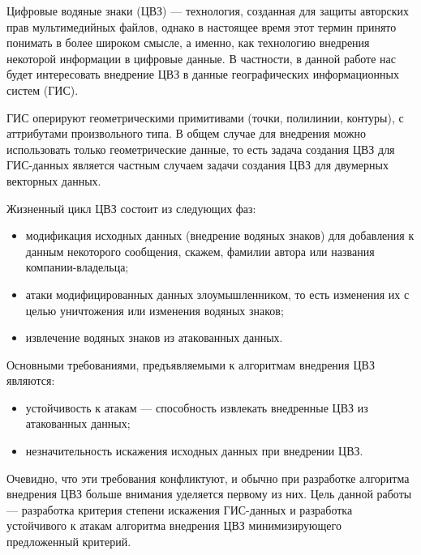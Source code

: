\startprefacepage

Цифровые водяные знаки (ЦВЗ) --- технология, созданная для защиты авторских прав мультимедийных файлов,
однако в настоящее время этот термин принято понимать в более широком смысле, а именно, как технологию
внедрения некоторой информации в цифровые данные. В частности, в данной работе нас будет интересовать
внедрение ЦВЗ в данные географических информационных систем (ГИС).

ГИС оперируют геометрическими примитивами (точки, полилинии, контуры), с аттрибутами 
произвольного типа. В общем случае для внедрения можно использовать только геометрические данные,
то есть задача создания ЦВЗ для ГИС-данных является частным случаем задачи создания ЦВЗ для двумерных векторных данных.

Жизненный цикл ЦВЗ состоит из следующих фаз:
\begin{itemize}
  \item модификация исходных данных (внедрение водяных знаков) для добавления к данным 
  некоторого сообщения, скажем, фамилии автора или названия компании-владельца; 
  \item атаки модифицированных данных злоумышленником, то есть изменения их с целью уничтожения 
  или изменения водяных знаков;
  \item извлечение водяных знаков из атакованных данных.
\end{itemize}

Основными требованиями, предъявляемыми к алгоритмам внедрения ЦВЗ являются:
\begin{itemize}
  \item устойчивость к атакам --- способность извлекать внедренные ЦВЗ из атакованных данных;
  \item незначительность искажения исходных данных при внедрении ЦВЗ.
\end{itemize}

Очевидно, что эти требования конфликтуют, и обычно при разработке алгоритма внедрения ЦВЗ
больше внимания уделяется первому из них. Цель данной работы --- разработка критерия степени искажения
ГИС-данных и разработка устойчивого к атакам алгоритма внедрения ЦВЗ
минимизирующего предложенный критерий.

